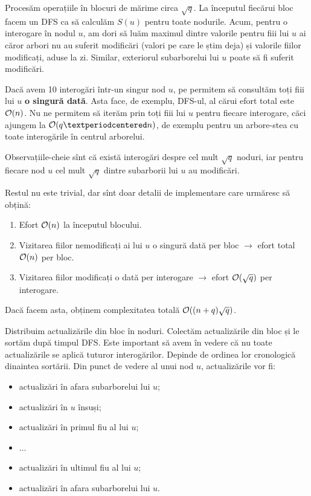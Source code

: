 \documentclass[../main.tex]{subfiles}
\begin{document}
Procesăm operațiile în blocuri de mărime circa $\sqrt{q}$. La începutul fiecărui bloc facem un DFS ca să calculăm $S(u)$ pentru toate nodurile. Acum, pentru o interogare în nodul $u$, am dori să luăm maximul dintre valorile pentru fiii lui $u$ ai căror arbori nu au suferit modificări (valori pe care le știm deja) și valorile fiilor modificați, aduse la zi. Similar, exteriorul subarborelui lui $u$ poate să fi suferit modificări.

Dacă avem 10 interogări într-un singur nod $u$, pe permitem să consultăm toți fiii lui $u$ \textbf{o singură dată}. Asta face, de exemplu, DFS-ul, al cărui efort total este $\mathcal{O}(n)$. Nu ne permitem să iterăm prin toți fiii lui $u$ pentru fiecare interogare, căci ajungem la $\bigoh(q·n)$, de exemplu pentru un arbore-stea cu toate interogările în centrul arborelui.

Observațiile-cheie sînt că există interogări despre cel mult $\sqrt{q}$ noduri, iar pentru fiecare nod $u$ cel mult $\sqrt{q}$ dintre subarborii lui $u$ au modificări.

Restul nu este trivial, dar sînt doar detalii de implementare care urmăresc să obțină:

\begin{enumerate}
  \item Efort $\mathcal{O}(n)$ la începutul blocului.

  \item Vizitarea fiilor nemodificați ai lui $u$ o singură dată per bloc $\to$ efort total $\mathcal{O}(n)$ per bloc.

  \item Vizitarea fiilor modificați o dată per interogare $\to$ efort $\mathcal{O}(\sqrt{q})$ per interogare.
\end{enumerate}

Dacă facem asta, obținem complexitatea totală $\mathcal{O}((n + q) \sqrt{q})$.

Distribuim actualizările din bloc în noduri. Colectăm actualizările din bloc și le sortăm după timpul DFS. Este important să avem în vedere că nu toate actualizările se aplică tuturor interogărilor. Depinde de ordinea lor cronologică dinaintea sortării. Din punct de vedere al unui nod $u$, actualizările vor fi:

\begin{itemize}
  \item actualizări în afara subarborelui lui $u$;
  \item actualizări în $u$ însuși;
  \item actualizări în primul fiu al lui $u$;
  \item $\dots$
  \item actualizări în ultimul fiu al lui $u$;
  \item actualizări în afara subarborelui lui $u$.
\end{itemize}
\end{document}
